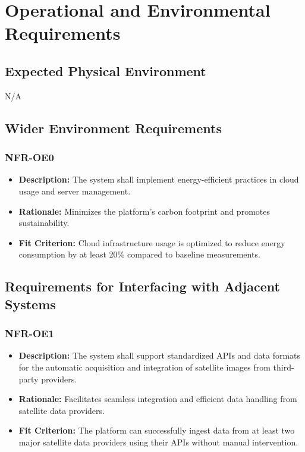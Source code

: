 \documentclass[12pt]{article}
\begin{document}
\section{Operational and Environmental Requirements}
\subsection{Expected Physical Environment}
N/A
\subsection{Wider Environment Requirements}
\subsubsection*{NFR-OE0}
\begin{itemize}
  \item \textbf{Description:} The system shall implement energy-efficient practices in cloud usage and server management.
  \item \textbf{Rationale:} Minimizes the platform’s carbon footprint and promotes sustainability.
  \item \textbf{Fit Criterion:} Cloud infrastructure usage is optimized to reduce energy consumption by at least 20\% compared to baseline measurements.
\end{itemize}
\subsection{Requirements for Interfacing with Adjacent Systems}
\subsubsection*{NFR-OE1}
\begin{itemize}
  \item \textbf{Description:} The system shall support standardized APIs and data formats for the automatic acquisition and integration of satellite images from third-party providers.
  \item \textbf{Rationale:} Facilitates seamless integration and efficient data handling from satellite data providers.
  \item \textbf{Fit Criterion:} The platform can successfully ingest data from at least two major satellite data providers using their APIs without manual intervention.
\end{itemize}
\end{document}

